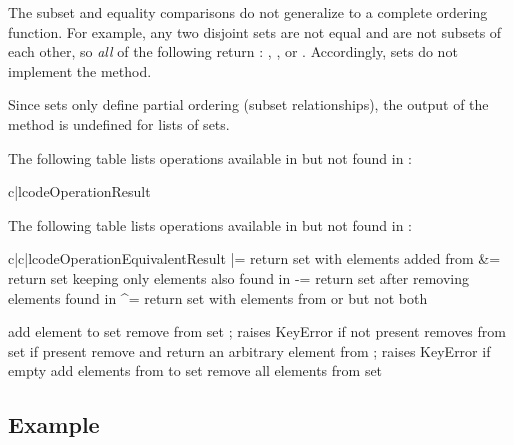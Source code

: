 The subset and equality comparisons do not generalize to a complete
ordering function.  For example, any two disjoint sets are not equal and
are not subsets of each other, so \emph{all} of the following return
:  , , or
.
Accordingly, sets do not implement the  method.

Since sets only define partial ordering (subset relationships), the output
of the  method is undefined for lists of sets.

The following table lists operations available in 
but not found in :

\begin{tableii}{c|l}{code}{Operation}{Result}
\end{tableii}

The following table lists operations available in 
but not found in :

\begin{tableiii}{c|c|l}{code}{Operation}{Equivalent}{Result}
         { |= }
         {return set  with elements added from }
         { \&= }
         {return set  keeping only elements also found in }
         { -= }
         {return set  after removing elements found in }
         { \textasciicircum= }
         {return set  with elements from  or 
          but not both}

  \hline
         {add element  to set }
         {remove  from set ; raises KeyError if not present}
         {removes  from set  if present}
         {remove and return an arbitrary element from ; raises
	  KeyError if empty}
         {add elements from  to set }
         {remove all elements from set }
\end{tableiii}


\subsection{Example \label{set-example}}

